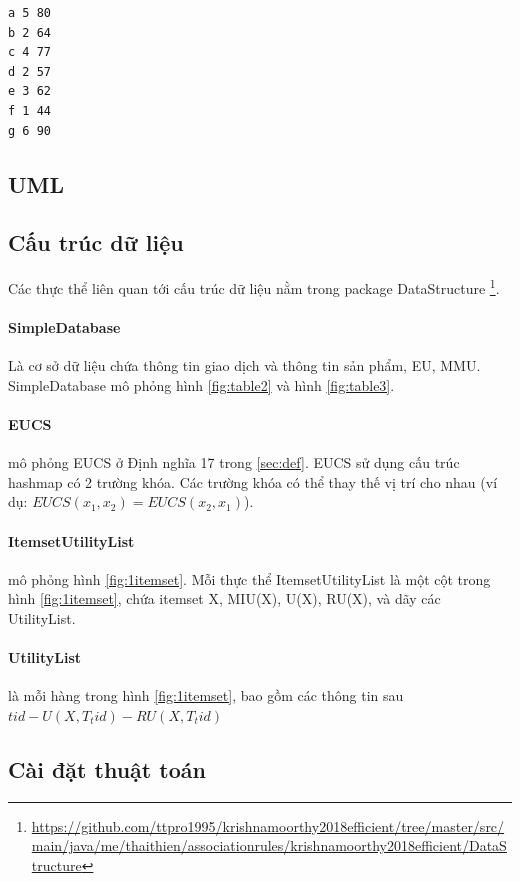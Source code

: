 \begin{lstlisting}[caption={tập tin item\_profit\_and\_minimum\_thresholds.txt}, label={lst:mmu}, language=bash]
a 5 80
b 2 64
c 4 77
d 2 57
e 3 62
f 1 44
g 6 90
\end{lstlisting}


\subsection{UML}

\subsection{Cấu trúc dữ liệu}

Các thực thể liên quan tới cấu trúc dữ liệu nằm trong package DataStructure \footnote{\url{https://github.com/ttpro1995/krishnamoorthy2018efficient/tree/master/src/main/java/me/thaithien/associationrules/krishnamoorthy2018efficient/DataStructure}}. 

\paragraph{SimpleDatabase} Là cơ sở dữ liệu chứa thông tin giao dịch và thông tin sản phẩm, EU, MMU. SimpleDatabase mô phỏng hình \ref{fig:table2} và hình \ref{fig:table3}.

\paragraph{EUCS} mô phỏng EUCS ở Định nghĩa 17 trong \ref{sec:def}. EUCS sử dụng cấu trúc hashmap có 2 trường khóa. Các trường khóa có thể thay thế vị trí cho nhau (ví dụ: $EUCS(x_1, x_2) = EUCS(x_2, x_1)$). 

\paragraph{ItemsetUtilityList} mô phỏng hình \ref{fig:1itemset}. Mỗi thực thể ItemsetUtilityList là một cột trong hình \ref{fig:1itemset}, chứa itemset X, MIU(X), U(X), RU(X), và dãy các UtilityList. 

\paragraph{UtilityList} là mỗi hàng trong hình \ref{fig:1itemset}, bao gồm các thông tin sau  $tid - U(X, T_tid) - RU(X, T_tid)$

\subsection{Cài đặt thuật toán}

